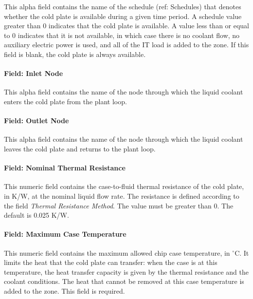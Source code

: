 This alpha field contains the name of the schedule (ref: Schedules) that denotes whether the cold plate is available during a given time period. A schedule value greater than 0 indicates that the cold plate is available. A value less than or equal to 0 indicates that it is not available, in which case there is no coolant flow, no auxiliary electric power is used, and all of the IT load is added to the zone. If this field is blank, the cold plate is always available.

\paragraph{Field: Inlet Node}\label{field-inlet-node-coilcoolingitecoldplate}

This alpha field contains the name of the node through which the liquid coolant enters the cold plate from the plant loop.

\paragraph{Field: Outlet Node}\label{field-outlet-node-coilcoolingitecoldplate}

This alpha field contains the name of the node through which the liquid coolant leaves the cold plate and returns to the plant loop.

\paragraph{Field: Nominal Thermal Resistance}\label{field-nominal-thermal-resistance-coilcoolingitecoldplate}

This numeric field contains the case-to-fluid thermal resistance of the cold plate, in K/W, at the nominal liquid flow rate. The resistance is defined according to the field \emph{Thermal Resistance Method}. The value must be greater than 0. The default is 0.025 K/W.

\paragraph{Field: Maximum Case Temperature}\label{field-maximum-case-temperature-coilcoolingitecoldplate}

This numeric field contains the maximum allowed chip case temperature, in $^\circ$C. It limits the heat that the cold plate can transfer: when the case is at this temperature, the heat transfer capacity is given by the thermal resistance and the coolant conditions. The heat that cannot be removed at this case temperature is added to the zone. This field is required.

